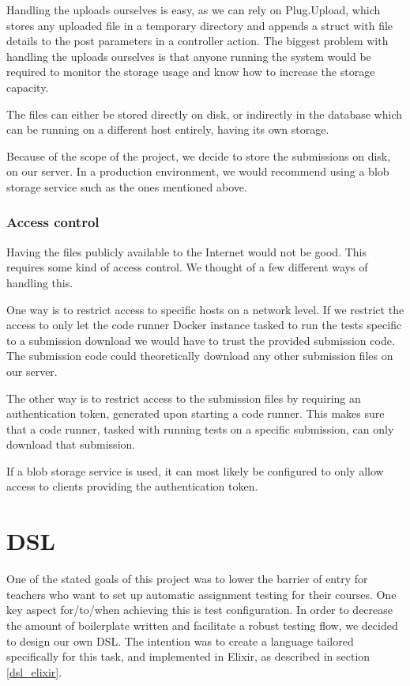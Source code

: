 Handling the uploads ourselves is easy, as we can rely on Plug.Upload, which stores any uploaded file in a temporary directory and appends a struct with file details to the post parameters in a controller action. The biggest problem with handling the uploads ourselves is that anyone running the system would be required to monitor the storage usage and know how to increase the storage capacity.

The files can either be stored directly on disk, or indirectly in the database which can be running on a different host entirely, having its own storage.

Because of the scope of the project, we decide to store the submissions on disk, on our server. In a production environment, we would recommend using a blob storage service such as the ones mentioned above.

\subsubsection{Access control}

Having the files publicly available to the Internet would not be good. This requires some kind of access control. We thought of a few different ways of handling this.

One way is to restrict access to specific hosts on a network level. If we restrict the access to only let the code runner Docker instance tasked to run the tests specific to a submission download we would have to trust the provided submission code. The submission code could theoretically download any other submission files on our server.

The other way is to restrict access to the submission files by requiring an authentication token, generated upon starting a code runner. This makes sure that a code runner, tasked with running tests on a specific submission, can only download that submission.

If a blob storage service is used, it can most likely be configured to only allow access to clients providing the authentication token.

\section{DSL}
One of the stated goals of this project was to lower the barrier of entry for teachers who want to set up automatic assignment testing for their courses. One key aspect for/to/when achieving this is test configuration. In order to decrease the amount of boilerplate written and facilitate a robust testing flow, we decided to design our own DSL. The intention was to create a language tailored specifically for this task, and implemented in Elixir, as described in section \ref{dsl_elixir}.

